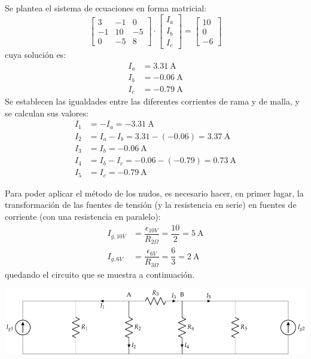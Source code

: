 Se plantea el sistema de ecuaciones en forma matricial:
\begin{equation*}
  \begin{bmatrix}
    3 & -1 & 0 \\
    -1 & 10 & -5 \\
    0 & -5 & 8
  \end{bmatrix} \cdot
  \begin{bmatrix}
    I_a\\
    I_b\\
    I_c
  \end{bmatrix} = %
  \begin{bmatrix}
    10 \\
    0\\
    -6
  \end{bmatrix}
\end{equation*}
cuya solución es:
\begin{align*}
  I_a&=\qty{3.31}{\ampere}\\
  I_b&=\qty{-0.06}{\ampere}\\
  I_c&= \qty{-0.79}{\ampere}
\end{align*}
Se establecen las igualdades entre las diferentes corrientes de rama y
de malla, y se calculan sus valores:
\begin{align*}
  I_1&=-I_a=\qty{-3.31}{\ampere}\\
  I_2&=I_a-I_b=3.31-(-0.06)=\qty{3.37}{\ampere}\\
  I_3&=I_b=\qty{-0.06}{\ampere}\\
  I_4&=I_b-I_c=-0.06-(-0.79)=\qty{0.73}{\ampere}\\
  I_5&=I_c=\qty{-0.79}{\ampere}
\end{align*}
	
Para poder aplicar el método de los nudos, es necesario hacer, en
primer lugar, la transformación de las fuentes de tensión (y la
resistencia en serie) en fuentes de corriente (con una resistencia en
paralelo):
\begin{align*}
  I_{g,10V}&=\dfrac{\epsilon_{10V}}{R_{2\Omega}}=\dfrac{10}{2}=\qty{5}{\ampere}\\
  I_{g,6V}&=\dfrac{\epsilon_{6V}}{R_{3\Omega}}=\dfrac{6}{3}=\qty{2}{\ampere}
\end{align*}
quedando el circuito que se muestra a continuación.

\begin{center}
  \includegraphics{figuras/BT1_08_nudos.pdf}
\end{center}


